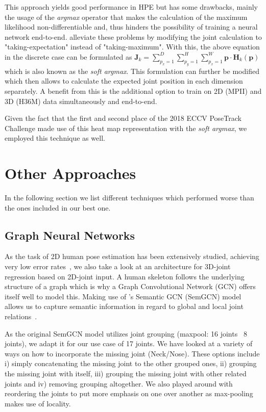 This approach yields good performance in HPE but has some drawbacks, mainly the usage of the \textit{argmax} operator that makes the calculation of the maximum likelihood non-differentiable and, thus hinders the possibility of training a neural network end-to-end.
\citeauthor{sun_integral_2018-1} {\cite{sun_integral_2018-1}} alleviate these problems by modifying the joint calculation to "taking-expectation" instead of "taking-maximum".
With this, the above equation in the discrete case can be formulated as
$\mathbf{J}_k = \sum_{p_x=1}^D\sum_{p_y=1}^H\sum_{p_x=1}^W\mathbf{p}\cdot \mathbf{H}_k(\mathbf{p})$
which is also known as the \textit{soft argmax}.
This formulation can further be modified which then allows to calculate the expected joint position in each dimension separately.
A benefit from this is the additional option to train on 2D (MPII) and 3D (H36M) data simultaneously and end-to-end.

Given the fact that the first \cite{sarandi_synthetic_2018} and second \cite{sun_integral_2018} place of the 2018 ECCV PoseTrack Challenge made use of this heat map representation with the \textit{soft argmax}, we employed this technique as well.


\section{Other Approaches}\label{approach}
In the following section we list different techniques which
performed worse than the ones included in our best one.%

\subsection{Graph Neural Networks}
As the task of 2D human pose estimation has been extensively studied, achieving very low
error rates~\cite{yang2020transpose, bulat2020skip, su2019multi},
we also take a look at an architecture for 3D-joint regression based on 2D-joint input.
A human skeleton follows the underlying structure of a graph which is why a
Graph Convolutional Network (GCN) offers itself well to model this.
Making use of \citeauthor{zhao2019gcn}'s Semantic GCN (SemGCN) model allows us to capture semantic
information in regard to global and local joint relations~\cite{zhao2019gcn}.

As the original SemGCN model utilizes joint grouping (maxpool: 16 joints \textrightarrow ~8 joints), we adapt it for
our use case of 17 joints.
We have looked at a variety of ways on how to incorporate the missing joint (Neck/Nose).
These options include i) simply concatenating the missing joint to the other grouped ones,
    ii) grouping the missing joint with itself,
    iii) grouping the missing joint with other related joints and
    iv) removing grouping altogether.
We also played around with reordering the joints to put more emphasis on one over another
as max-pooling makes use of locality.

